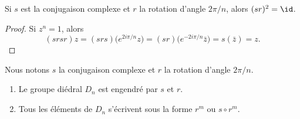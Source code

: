 \begin{proposition}
	Si \( s\) est la conjugaison complexe et \( r\) la rotation d'angle \( 2\pi/n\), alors \( (sr)^2=\id\).
\end{proposition}

\begin{proof}
	Si \( z^n=1\), alors
	\begin{equation}
		(srsr)z=(srs)\big(  e^{2 i\pi/n}z \big)=(sr)\big(  e^{-2i\pi /n}\bar z \big)=s(\bar z)=z.
	\end{equation}
\end{proof}

\begin{proposition} \label{PropLDIPoZ}
	Nous notons \( s\) la conjugaison complexe et \( r\) la rotation d'angle \( 2\pi/n\).
	\begin{enumerate}
		\item
		      Le groupe diédral \( D_n\) est engendré par \( s\) et \( r\).
		\item       \label{ITEMooOEBHooULRmZk}
		      Tous les éléments de \( D_n\) s'écrivent sous la forme \( r^m\) ou \( s\circ r^m\).
	\end{enumerate}
\end{proposition}

